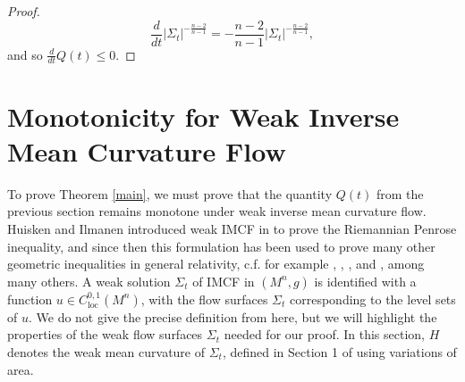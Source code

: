\documentclass[12pt]{amsart}
\theoremstyle{definition}
\numberwithin{equation}{section}
\begin{document}
\begin{proof}
\begin{equation*}
    \frac{d}{dt} |\Sigma_{t}|^{- \frac{n-2}{n-1}} = - \frac{n-2}{n-1} |\Sigma_{t}|^{-\frac{n-2}{n-1}},
\end{equation*}
and so $\frac{d}{dt} Q(t) \leq 0$. %


\end{proof}



    
\section{Monotonicity for Weak Inverse Mean Curvature Flow}
To prove Theorem \ref{main}, we must prove that the quantity $Q(t)$ from the previous section remains monotone under weak inverse mean curvature flow. Huisken and Ilmanen introduced weak IMCF in \cite{HI99} to prove the Riemannian Penrose inequality, and since then this formulation has been used to prove many other geometric inequalities in general relativity, c.f. for example \cite{FS13}, \cite{LN13}, \cite{KWY17}, and \cite{C16}, among many others. A weak solution $\Sigma_{t}$ of IMCF in $(M^{n},g)$ is identified with a function $u \in C^{0,1}_{\text{loc}} (M^{n})$, with the flow surfaces $\Sigma_{t}$ corresponding to the level sets of $u$. We do not give the precise definition from \cite{HI99} here, but we will highlight the properties of the weak flow surfaces $\Sigma_{t}$ needed for our proof. In this section, $H$ denotes the weak mean curvature of $\Sigma_{t}$, defined in Section 1 of \cite{HI99} using variations of area.
\end{document}
